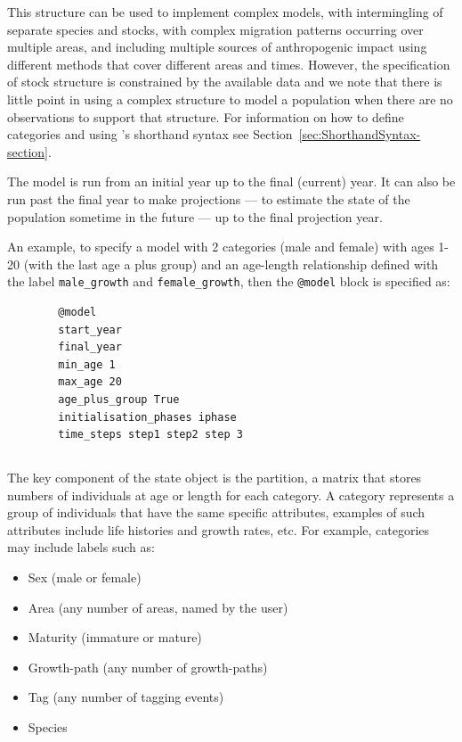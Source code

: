 This structure can be used to implement complex models, with intermingling of separate species and stocks, with complex migration patterns occurring over multiple areas, and including multiple sources of anthropogenic impact using different methods that cover different areas and times. However, the specification of stock structure is constrained by the available data and we note that there is little point in using a complex structure to model a population when there are no observations to support that structure.  For information on how to define categories and using \CNAME's shorthand syntax see Section~\ref{sec:ShorthandSyntax-section}.

The model is run from an initial year up to the final (current) year. It can also be run past the final year to make projections --- to estimate the state of the population sometime in the future --- up to the final projection year.

An example, to specify a model with 2 categories (male and female) with ages 1-20 (with the last age a plus group) and an age-length relationship defined with the label \texttt{male\_growth} and \texttt{female\_growth}, then the \texttt{@model} block is specified as:
{\small{\begin{verbatim}
		@model
		start_year
		final_year
		min_age 1
		max_age 20
		age_plus_group True
		initialisation_phases iphase
		time_steps step1 step2 step 3
\end{verbatim}}}

\subsection{}

The key component of the state object is the partition, a matrix that stores numbers of individuals at age or length for each category. A category represents a group of individuals that have the same specific attributes, examples of such attributes include life histories and growth rates, etc. For example, categories may include labels such as:

\begin{itemize}
\item Sex (male or female)
\item Area (any number of areas, named by the user)
\item Maturity (immature or mature)
\item Growth-path (any number of growth-paths)
\item Tag (any number of tagging events)
\item Species
\end{itemize}

